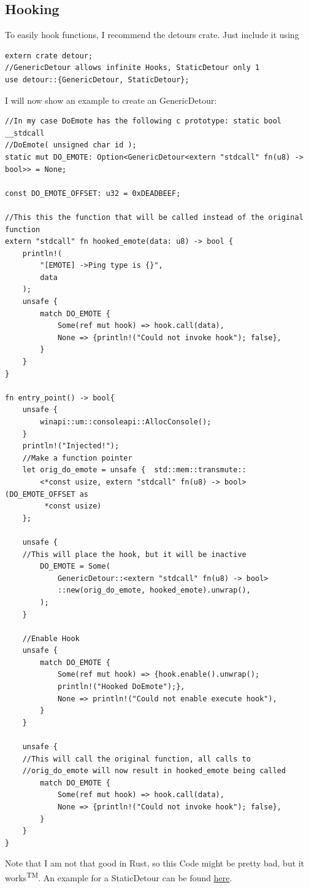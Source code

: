 \documentclass[]{scrartcl}
\begin{document}
\subsection{Hooking}

To easily hook functions, I recommend the detours crate. Just include it using

\begin{verbatim}
extern crate detour;
//GenericDetour allows infinite Hooks, StaticDetour only 1
use detour::{GenericDetour, StaticDetour};
\end{verbatim}
\noindent
I will now show an example to create an GenericDetour:

\begin{verbatim}
//In my case DoEmote has the following c prototype: static bool __stdcall
//DoEmote( unsigned char id );
static mut DO_EMOTE: Option<GenericDetour<extern "stdcall" fn(u8) -> bool>> = None;

const DO_EMOTE_OFFSET: u32 = 0xDEADBEEF;

//This this the function that will be called instead of the original function
extern "stdcall" fn hooked_emote(data: u8) -> bool {
	println!(
		"[EMOTE] ->Ping type is {}",
		data
	);
	unsafe {
		match DO_EMOTE {
			Some(ref mut hook) => hook.call(data),
			None => {println!("Could not invoke hook"); false},
		}
	}
}

fn entry_point() -> bool{
	unsafe {
		winapi::um::consoleapi::AllocConsole();
	}
	println!("Injected!");
	//Make a function pointer
	let orig_do_emote = unsafe {  std::mem::transmute::
		<*const usize, extern "stdcall" fn(u8) -> bool>(DO_EMOTE_OFFSET as
		 *const usize)
	};

	unsafe {
	//This will place the hook, but it will be inactive
		DO_EMOTE = Some(
			GenericDetour::<extern "stdcall" fn(u8) -> bool>
			::new(orig_do_emote, hooked_emote).unwrap(),
		);
	}

	//Enable Hook
	unsafe {
		match DO_EMOTE {
			Some(ref mut hook) => {hook.enable().unwrap();
			println!("Hooked DoEmote");},
			None => println!("Could not enable execute hook"),
		}
	}

	unsafe {
	//This will call the original function, all calls to
	//orig_do_emote will now result in hooked_emote being called
		match DO_EMOTE {
			Some(ref mut hook) => hook.call(data),
			None => {println!("Could not invoke hook"); false},
		}
	}
}
\end{verbatim}
\noindent
Note that I am not that good in Rust, so this Code might be pretty bad, but it works\textsuperscript{TM}. An example for a StaticDetour can be found \href{https://docs.rs/detour/0.5.0/detour/macro.static_detours.html#example}{here}.
\end{document}
